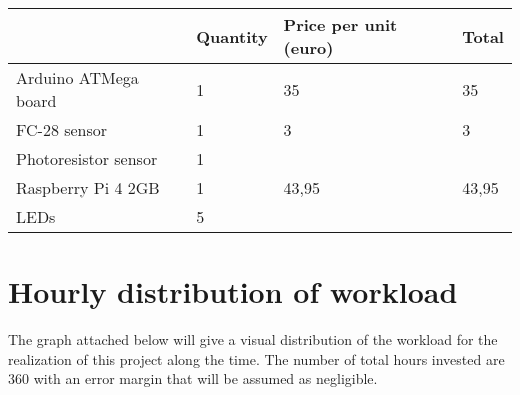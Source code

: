 \begin{table}[]
\begin{tabular}{llll}
\hline
	\rowcolor{lightpurple} 
	& \textbf{Quantity}& \textbf{Price per unit (euro)}& \textbf{Total} \\ \hline
	\rowcolor{lightgray} 
Arduino ATMega board & 1                                        & 35                                                 & 35                                    \\
FC-28 sensor         & 1                                        & 3                                                  & 3                                     \\
	\rowcolor{lightgray} 
Photoresistor sensor & 1                                        &                                                    &                                       \\
Raspberry Pi 4 2GB   & 1                                        & 43,95                                              & 43,95                                 \\
\rowcolor{lightgray} 
LEDs                 & 5                                        &                                                    &                                      
\end{tabular}
\end{table}

\section{Hourly distribution of workload}
The graph attached below will give a visual distribution of the workload for the realization of this project along the time. The number of total hours invested are 360 with an error margin that will be assumed as negligible.

